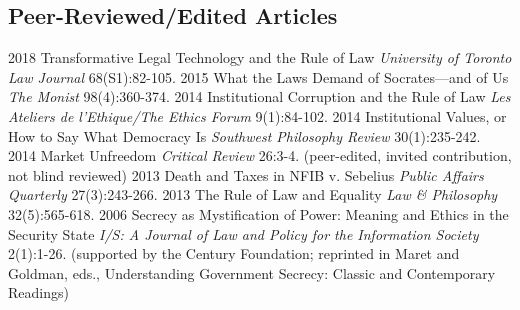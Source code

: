 \documentclass[letterpaper]{moderncv}
\begin{document}
\subsection{Peer-Reviewed/Edited Articles}
\cventry
{2018}
{Transformative Legal Technology and the Rule of Law}
{}
{\textit{University of Toronto Law Journal}}
{}
{68(S1):82-105. }
\vspace{1mm}
\cventry
{2015}
{What the Laws Demand of Socrates---and of Us}
{}
{\textit{The Monist}}
{}
{98(4):360-374. }
\vspace{1mm}
\cventry
{2014}
{Institutional Corruption and the Rule of Law}
{}
{\textit{Les Ateliers de l'Ethique/The Ethics Forum}}
{}
{9(1):84-102. }
\vspace{1mm}
\cventry
{2014}
{Institutional Values, or How to Say What Democracy Is}
{}
{\textit{Southwest Philosophy Review}}
{}
{30(1):235-242. }
\vspace{1mm}
\cventry
{2014}
{Market Unfreedom}
{}
{\textit{Critical Review}}
{}
{26:3-4. (peer-edited, invited contribution, not blind reviewed)}
\vspace{1mm}
\cventry
{2013}
{Death and Taxes in NFIB v. Sebelius}
{}
{\textit{Public Affairs Quarterly}}
{}
{27(3):243-266. }
\vspace{1mm}
\cventry
{2013}
{The Rule of Law and Equality}
{}
{\textit{Law \& Philosophy}}
{}
{32(5):565-618. }
\vspace{1mm}
\cventry
{2006}
{Secrecy as Mystification of Power: Meaning and Ethics in the Security State}
{}
{\textit{ I/S: A Journal of Law and Policy for the Information Society}}
{}
{2(1):1-26. (supported by the Century Foundation; reprinted in Maret and Goldman, eds., Understanding Government Secrecy: Classic and Contemporary Readings)}
\vspace{1mm}
\vspace{1mm}
\end{document}
